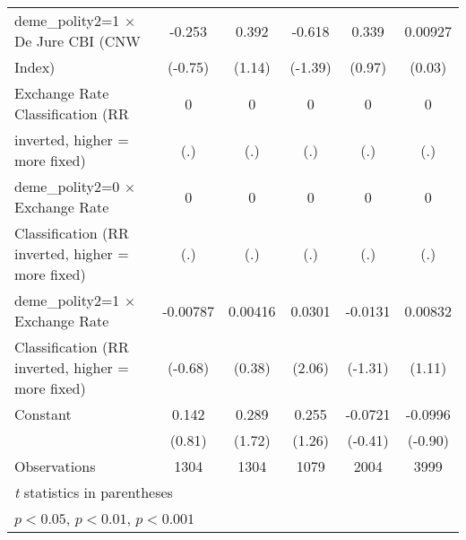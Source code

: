 {\begin{tabular}{l*{5}{c}}
\addlinespace
deme\_polity2=1 $\times$ De Jure CBI (CNW&-0.253         &0.392         &-0.618         &0.339         &0.00927         \\
Index)                                  &(-0.75)         &(1.14)         &(-1.39)         &(0.97)         &(0.03)         \\
\addlinespace
Exchange Rate Classification (RR        &    0         &    0         &    0         &    0         &    0         \\
inverted, higher = more fixed)          &  (.)         &  (.)         &  (.)         &  (.)         &  (.)         \\
\addlinespace
deme\_polity2=0 $\times$ Exchange Rate   &    0         &    0         &    0         &    0         &    0         \\
Classification (RR inverted, higher = more fixed)&  (.)         &  (.)         &  (.)         &  (.)         &  (.)         \\
\addlinespace
deme\_polity2=1 $\times$ Exchange Rate   &-0.00787         &0.00416         &0.0301\sym{*}  &-0.0131         &0.00832         \\
Classification (RR inverted, higher = more fixed)&(-0.68)         &(0.38)         &(2.06)         &(-1.31)         &(1.11)         \\
\addlinespace
Constant                                &0.142         &0.289         &0.255         &-0.0721         &-0.0996         \\
                                        &(0.81)         &(1.72)         &(1.26)         &(-0.41)         &(-0.90)         \\
\midrule
Observations                            & 1304         & 1304         & 1079         & 2004         & 3999         \\
\bottomrule
\multicolumn{6}{l}{\footnotesize \textit{t} statistics in parentheses}\\
\multicolumn{6}{l}{\footnotesize \sym{*} \(p<0.05\), \sym{**} \(p<0.01\), \sym{***} \(p<0.001\)}\\
\end{tabular}
}
